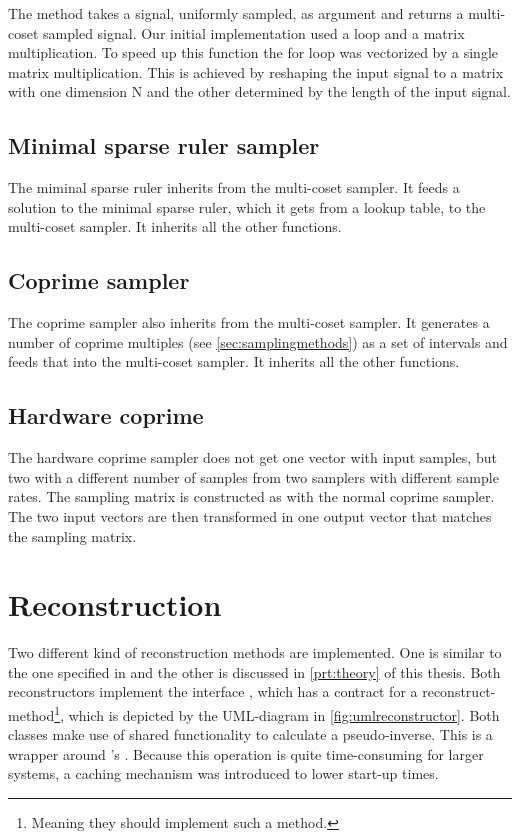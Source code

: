 \documentclass[a4paper, openany, oneside]{memoir}
\begin{document}
The method  takes a signal, uniformly sampled, as argument and returns a multi-coset sampled signal. Our initial implementation used a loop and a matrix multiplication. To speed up this function the for loop was vectorized by a single matrix multiplication. This is achieved by reshaping the input signal to a matrix with one dimension N and the other determined by the length of the input signal.

\subsection{Minimal sparse ruler sampler}
\label{sec:multi-coset-sampler}
The miminal sparse ruler inherits from the multi-coset sampler. It feeds a solution to the minimal sparse ruler, which it gets from a lookup table, to the multi-coset sampler. It inherits all the other functions.

\subsection{Coprime sampler}
\label{sec:coprime-sampler}
The coprime sampler also inherits from the multi-coset sampler. It generates a number of coprime multiples (see \cref{sec:samplingmethods}) as a set of intervals and feeds that into the multi-coset sampler. It inherits all the other functions.

\subsection{Hardware coprime}
\label{sec:hardware-coprime}
The hardware coprime sampler does not get one vector with input samples, but two with a different number of samples from two samplers with different sample rates. The sampling matrix is constructed as with the normal coprime sampler. The two input vectors are then transformed in one output vector that matches the sampling matrix.

\section{Reconstruction}
\label{sec:reconstruction}
Two different kind of reconstruction methods are implemented. One is similar to the one specified in \cite{ariananda2012compressive} and the other is discussed in \cref{prt:theory} of this thesis. Both reconstructors implement the interface , which has a contract for a reconstruct-method\footnote{Meaning they should implement such a method.}, which is depicted by the UML-diagram in \cref{fig:umlreconstructor}.
Both classes make use of shared functionality to calculate a pseudo-inverse. This is a wrapper around 's . Because this operation is quite time-consuming for larger systems, a caching mechanism was introduced to lower start-up times.%
\end{document}
